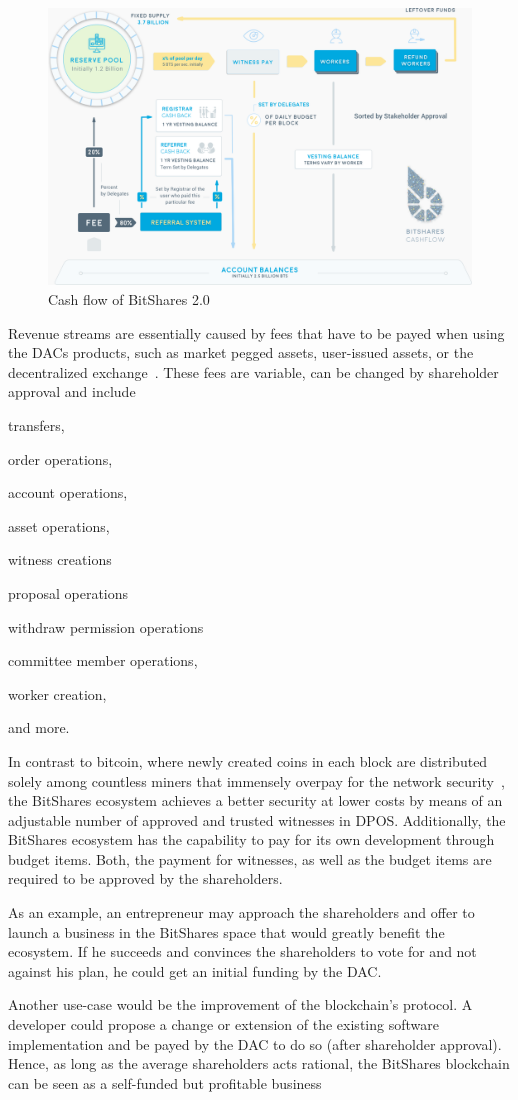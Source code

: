 \label{sec:bts:revenue:expenses}

\begin{figure}[!htp]
 \centering
 \includegraphics[width=.8\linewidth]{figures/cashflow.png}
 \caption{Cash flow of BitShares 2.0}
 \label{fig:cashflow}
\end{figure}

Revenue streams are essentially caused by fees that have to be payed when using
the DACs products, such as market pegged assets, user-issued assets, or the
decentralized exchange~\cite{bts:financial}. These fees are variable, can be
changed by shareholder approval and include
\begin{inparaenum}[(a)]
 \item transfers,
 \item order operations,
 \item account operations,
 \item asset operations,
 \item witness creations
 \item proposal operations
 \item withdraw permission operations
 \item committee member operations,
 \item worker creation,
\end{inparaenum}
and more.

In contrast to bitcoin, where newly created coins in each block are distributed
solely among countless miners that immensely overpay for the network
security~\cite{ltb:dac}, the BitShares ecosystem achieves a better security at
lower costs by means of an adjustable number of approved and trusted witnesses
in DPOS. Additionally, the BitShares ecosystem has the capability to pay for
its own development through budget items. Both, the payment for witnesses, as
well as the budget items are required to be approved by the shareholders.

As an example, an entrepreneur may approach the shareholders and offer to
launch a business in the BitShares space that would greatly benefit the
ecosystem. If he succeeds and convinces the shareholders to vote for and not
against his plan, he could get an initial funding by the DAC.

Another use-case would be the improvement of the blockchain's protocol. A
developer could propose a change or extension of the existing software
implementation and be payed by the DAC to do so (after shareholder approval).
Hence, as long as the average shareholders acts rational, the BitShares
blockchain can be seen as a self-funded but profitable business
